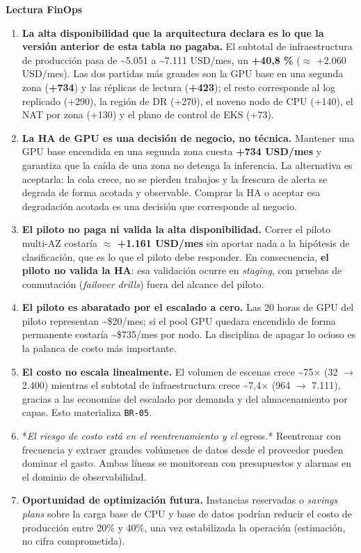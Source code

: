 \documentclass{article}
\newcommand{\mdhfour}[1]{\par\medskip\noindent\textbf{#1}\par\nobreak\smallskip}
\begin{document}
\mdhfour{Lectura FinOps}

\begin{enumerate}
  \item \textbf{La alta disponibilidad que la arquitectura declara es lo que la versión anterior de esta tabla no pagaba.} El subtotal de infraestructura de producción pasa de \textasciitilde{}5.051 a \textasciitilde{}7.111 USD/mes, un \textbf{+40,8 \%} (\ensuremath{\approx} +2.060 USD/mes). Las dos partidas más grandes son la GPU base en una segunda zona (\textbf{+734}) y las réplicas de lectura (\textbf{+423}); el resto corresponde al log replicado (+290), la región de DR (+270), el noveno nodo de CPU (+140), el NAT por zona (+130) y el plano de control de EKS (+73).
  \item \textbf{La HA de GPU es una decisión de negocio, no técnica.} Mantener una GPU base encendida en una segunda zona cuesta \textbf{+734 USD/mes} y garantiza que la caída de una zona no detenga la inferencia. La alternativa es aceptarla: la cola crece, no se pierden trabajos y la frescura de alerta se degrada de forma acotada y observable. Comprar la HA o aceptar esa degradación acotada es una decisión que corresponde al negocio.
  \item \textbf{El piloto no paga \textemdash{}ni valida\textemdash{} la alta disponibilidad.} Correr el piloto multi-AZ costaría \textbf{\ensuremath{\approx} +1.161 USD/mes} sin aportar nada a la hipótesis de clasificación, que es lo que el piloto debe responder. En consecuencia, \textbf{el piloto no valida la HA}: esa validación ocurre en \emph{staging}, con pruebas de conmutación (\emph{failover drills}) fuera del alcance del piloto.
  \item \textbf{El piloto es abaratado por el escalado a cero.} Las 20 horas de GPU del piloto representan \textasciitilde{}\$20/mes; si el pool GPU quedara encendido de forma permanente costaría \textasciitilde{}\$735/mes por nodo. La disciplina de apagar lo ocioso es la palanca de costo más importante.
  \item \textbf{El costo no escala linealmente.} El volumen de escenas crece \textasciitilde{}75\ensuremath{\times} (32 \ensuremath{\rightarrow} 2.400) mientras el subtotal de infraestructura crece \textasciitilde{}7,4\ensuremath{\times} (964 \ensuremath{\rightarrow} 7.111), gracias a las economías del escalado por demanda y del almacenamiento por capas. Esto materializa \texttt{BR-\allowbreak{}05}.
  \item *\emph{El riesgo de costo está en el reentrenamiento y el }egress\emph{.}* Reentrenar con frecuencia y extraer grandes volúmenes de datos desde el proveedor pueden dominar el gasto. Ambas líneas se monitorean con presupuestos y alarmas en el dominio de observabilidad.
  \item \textbf{Oportunidad de optimización futura.} Instancias reservadas o \emph{savings plans} sobre la carga base de CPU y base de datos podrían reducir el costo de producción entre 20\% y 40\%, una vez estabilizada la operación (estimación, no cifra comprometida).
\end{enumerate}
\end{document}

